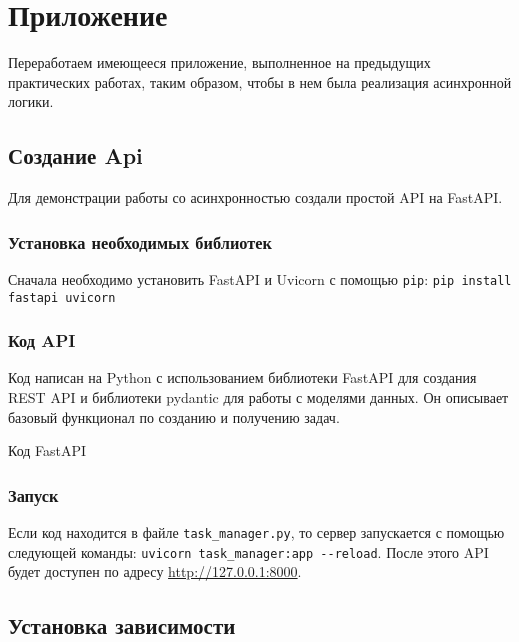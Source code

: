 \section{Приложение}

Переработаем имеющееся приложение,
выполненное на предыдущих практических работах, таким образом,
чтобы в нем была реализация асинхронной логики.

\subsection{Создание Api}

Для демонстрации работы со асинхронностью создали простой API
на FastAPI.

\subsubsection{Установка необходимых библиотек}

Сначала необходимо установить FastAPI и Uvicorn с помощью \texttt{pip}:
\verb|pip install fastapi uvicorn|

\subsubsection{Код API}

Код  написан на Python с использованием библиотеки FastAPI
для создания REST API и библиотеки pydantic для работы с моделями данных.
Он описывает базовый функционал по созданию и получению задач.

\begin{image}
	\caption{Код FastAPI}
	\label{fig:fastapi}
\end{image}

\subsubsection{Запуск}

Если код находится в файле \texttt{task\_manager.py},
то сервер запускается с помощью следующей команды:
\verb|uvicorn task_manager:app --reload|.
После этого API будет доступен по адресу \url{http://127.0.0.1:8000}.

\subsection{Установка зависимости}


